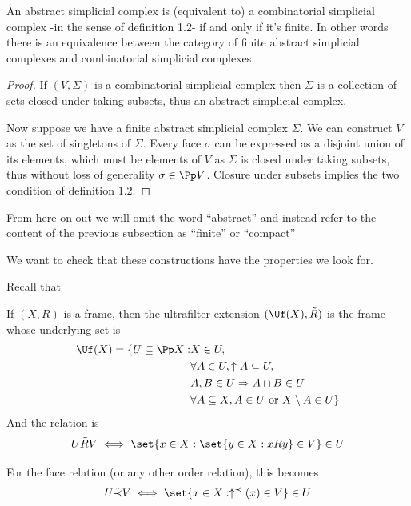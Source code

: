 \begin{proposition}\hfill

    An abstract simplicial complex is (equivalent to) a combinatorial simplicial complex -in the sense of definition 1.2- if and only if it's finite.
    In other words there is an equivalence between the category of finite abstract simplicial complexes and combinatorial simplicial complexes.
\end{proposition}
\begin{proof}
    If $(V,\Sigma)$ is a combinatorial simplicial complex then $\Sigma$ is a collection of sets closed under taking subsets, thus an abstract simplicial complex.

    Now suppose we have a finite abstract simplicial complex $\Sigma$. We can construct $V$ as the set of singletons of $\Sigma$. 
    Every face $\sigma$ can be expressed as a disjoint union of its elements, which must be elements of $V$ as $\Sigma$ is closed under taking subsets, thus without loss
    of generality $\sigma\in\Pp V$.
    Closure under subsets implies the two condition of definition $1.2$.
\end{proof}

From here on out we will omit the word ``abstract'' and instead refer to the content of the previous subsection as ``finite'' or ``compact''

We want to check that these constructions have the properties we look for.

Recall that 
\begin{definition}\hfill 

    If $(X,R)$ is a frame, then the ultrafilter extension $(\Uf(X),\tilde{R})$ is the frame whose underlying set is
    \begin{align*}
        \Uf(X)=\{U\subseteq \Pp X:& X\in U,\\
        & \forall A\in U, \uparrow A\subseteq U, \\
        & A,B\in U\Rightarrow A\cap B\in U\\
        &\forall A\subseteq X, A\in U \text{ or }X\setminus A\in U\}
    \end{align*}
    And the relation is 
    \[U \tilde{R} V \iff \set{x\in X: \set{y\in X: xRy}\in V}\in U\]

    For the face relation (or any other order relation), this becomes 
    \[U\tilde{\prec}V\iff\set{x\in X: \uparrow^\prec(x)\in V}\in U\]
\end{definition}

